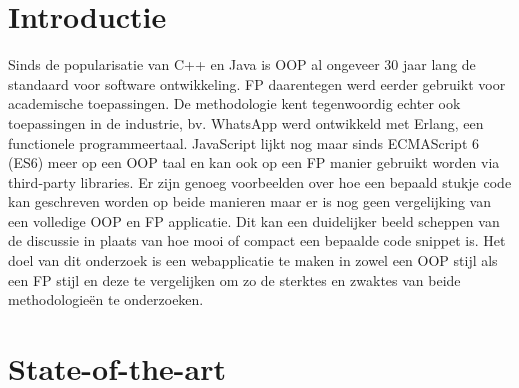 
\section{Introductie} %
\label{sec:introductie}



Sinds de popularisatie van C++ en Java is OOP al ongeveer 30 jaar lang de standaard voor software ontwikkeling. FP daarentegen werd eerder gebruikt voor academische toepassingen. De methodologie kent tegenwoordig echter ook toepassingen in de industrie, bv. WhatsApp werd ontwikkeld met Erlang, een functionele programmeertaal. JavaScript lijkt nog maar sinds ECMAScript 6 (ES6) meer op een OOP taal en kan ook op een FP manier gebruikt worden via third-party libraries. Er zijn genoeg voorbeelden over hoe een bepaald stukje code kan geschreven worden op beide manieren maar er is nog geen vergelijking van een volledige OOP en FP applicatie. Dit kan een duidelijker beeld scheppen van de discussie in plaats van hoe mooi of compact een bepaalde code snippet is. Het doel van dit onderzoek is een webapplicatie te maken in zowel een OOP stijl als een FP stijl en deze te vergelijken om zo de sterktes en zwaktes van beide methodologieën te onderzoeken.


\section{State-of-the-art}
\label{sec:state-of-the-art}


